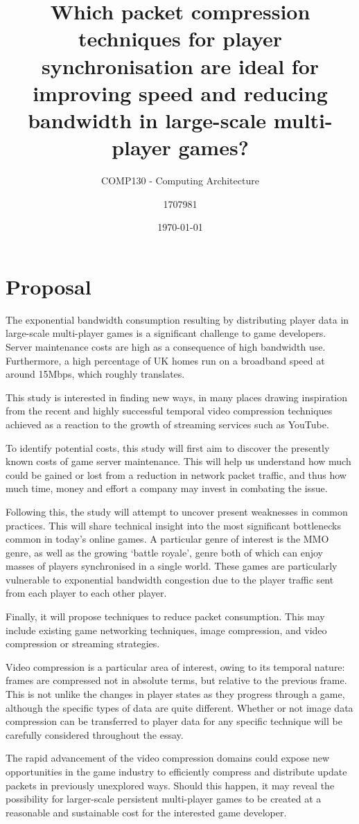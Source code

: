 \documentclass{scrartcl}
\title{Which packet compression techniques for player synchronisation are ideal for improving speed and reducing bandwidth in large-scale multi-player games?}
\subtitle{COMP130 - Computing Architecture}
\date{\today}
\author{1707981}
\begin{document}
\maketitle
{}

\section{Proposal}
The exponential bandwidth consumption resulting by distributing player data in large-scale multi-player games is a significant challenge to game developers. Server maintenance costs are high as a consequence of high bandwidth use. Furthermore, a high percentage of UK homes run on a broadband speed at around 15Mbps, which roughly translates.

This study is interested in finding new ways, in many places drawing inspiration from the recent and highly successful temporal video compression techniques achieved as a reaction to the growth of streaming services such as YouTube.

To identify potential costs, this study will first aim to discover the presently known costs of game server maintenance. This will help us understand how much could be gained or lost from a reduction in network packet traffic, and thus how much time, money and effort a company may invest in combating the issue.

Following this, the study will attempt to uncover present weaknesses in common practices. This will share technical insight into the most significant bottlenecks common in today's online games. A particular genre of interest is the MMO genre, as well as the growing `battle royale', genre both of which can enjoy masses of players synchronised in a single world. These games are particularly vulnerable to exponential bandwidth congestion due to the player traffic sent from each player to each other player.

Finally, it will propose techniques to reduce packet consumption. This may include existing game networking techniques, image compression, and video compression or streaming strategies.

Video compression is a particular area of interest, owing to its temporal nature: frames are compressed not in absolute terms, but relative to the previous frame. This is not unlike the changes in player states as they progress through a game, although the specific types of data are quite different. Whether or not image data compression can be transferred to player data for any specific technique will be carefully considered throughout the essay.

The rapid advancement of the video compression domains could expose new opportunities in the game industry to efficiently compress and distribute update packets in previously unexplored ways. Should this happen, it may reveal the possibility for larger-scale persistent multi-player games to be created at a reasonable and sustainable cost for the interested game developer.

\nocite{*}
 

\end{document}
